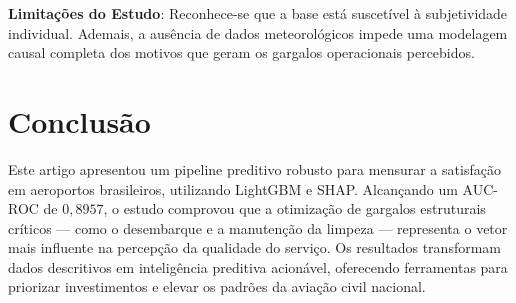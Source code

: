 \documentclass[12pt]{article}
\begin{document}
\textbf{Limitações do Estudo}: Reconhece-se que a base está suscetível à subjetividade individual. Ademais, a ausência de dados meteorológicos impede uma modelagem causal completa dos motivos que geram os gargalos operacionais percebidos.

\section{Conclusão}
Este artigo apresentou um pipeline preditivo robusto para mensurar a satisfação em aeroportos brasileiros, utilizando LightGBM e SHAP. Alcançando um AUC-ROC de $0,8957$, o estudo comprovou que a otimização de gargalos estruturais críticos — como o desembarque e a manutenção da limpeza — representa o vetor mais influente na percepção da qualidade do serviço. Os resultados transformam dados descritivos em inteligência preditiva acionável, oferecendo ferramentas para priorizar investimentos e elevar os padrões da aviação civil nacional. 

\FloatBarrier


\end{document}
